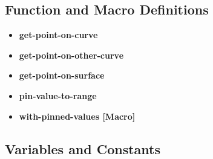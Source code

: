 \documentclass [11pt]{book}
\begin{document}
\subsection{Function and Macro Definitions}

\label{subsec:functionandmacrodefinitions}



\begin{itemize}

\item {}
\label{prim:get-point-on-curve}
\textbf{get-point-on-curve}





\item {}
\label{prim:get-point-on-other-curve}
\textbf{get-point-on-other-curve}





\item {}
\label{prim:get-point-on-surface}
\textbf{get-point-on-surface}





\item {}
\label{prim:pin-value-to-range}
\textbf{pin-value-to-range}





\item {}
\label{prim:with-pinned-values}
\textbf{with-pinned-values [Macro]}





\end{itemize}



\subsection{Variables and Constants}

\label{subsec:variablesandconstants}
\end{document}

